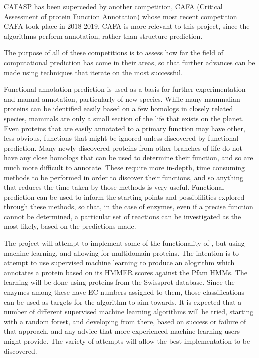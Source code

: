\documentclass[12pt]{report}
\begin{document}
		CAFASP has been superceded by another competition, CAFA (Critical Assessment of protein Function Annotation) \citep{RefWorks:doc:5d82345ae4b09beeb95d60bb} whose most recent competition CAFA took place in 2018-2019.  CAFA is more relevant to this project, since the algorithms perform annotation, rather than structure prediction.  %
		
		The purpose of all of these competitions is to assess how far the field of computational prediction has come in their areas, so that further advances can be made using techniques that iterate on the most successful.
		
		Functional annotation prediction is used as a basis for further experimentation and manual annotation, particularly of new species.  While many mammalian proteins can be identified easily based on a few homologs in closely related species, mammals are only a small section of the life that exists on the planet.  Even proteins that are easily annotated to a primary function may have other, less obvious, functions that might be ignored unless discovered by functional prediction.  Many newly discovered proteins from other branches of life do not have any close homologs that can be used to determine their function, and so are much more difficult to annotate.  These require more in-depth, time consuming methods to be performed in order to discover their functions, and so anything that reduces the time taken by those methods is very useful.  Functional prediction can be used to inform the starting points and possiblilities explored through these methods, so that, in the case of enzymes, even if a precise function cannot be determined, a particular set of reactions can be investigated as the most likely, based on the predictions made.  %
		
		The project will attempt to implement some of the functionality of \cite{RefWorks:doc:5d88bf0fe4b037ddf3555c0b}, but using machine learning, and allowing for multidomain proteins.  The intention is to attempt to use supervised machine learning to produce an alogrithm which annotates a protein based on its HMMER scores against the Pfam HMMs.  The learning will be done using proteins from the Swissprot database.  Since the enzymes among these have EC numbers assigned to them, those classifications can be used as targets for the algorithm to aim towards.  It is expected that a number of different supervised machine learning algorithms will be tried, starting with a random forest, and developing from there, based on success or failure of that approach, and any advice that more experienced machine learning users might provide.  The variety of attempts will allow the best implementation to be discovered.  %
		
\end{document}
